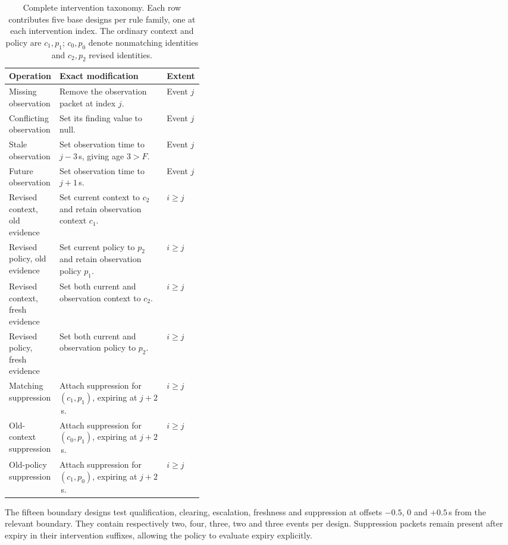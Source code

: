\documentclass[preprint,11pt]{elsarticle}
\begin{document}
\begin{table}[H]
\centering\small
\caption{Complete intervention taxonomy. Each row contributes five base designs per rule family, one at each intervention index. The ordinary context and policy are $c_1,p_1$; $c_0,p_0$ denote nonmatching identities and $c_2,p_2$ revised identities.}
\label{tab:intervention-taxonomy}
\begin{tabularx}{\linewidth}{@{}>{\raggedright\arraybackslash}p{0.26\linewidth}>{\raggedright\arraybackslash}X>{\raggedright\arraybackslash}p{0.12\linewidth}@{}}
\toprule
Operation & Exact modification & Extent \\
\midrule
Missing observation & Remove the observation packet at index $j$. & Event $j$ \\
Conflicting observation & Set its finding value to null. & Event $j$ \\
Stale observation & Set observation time to $j-3$\,s, giving age $3>F$. & Event $j$ \\
Future observation & Set observation time to $j+1$\,s. & Event $j$ \\
Revised context, old evidence & Set current context to $c_2$ and retain observation context $c_1$. & $i\ge j$ \\
Revised policy, old evidence & Set current policy to $p_2$ and retain observation policy $p_1$. & $i\ge j$ \\
Revised context, fresh evidence & Set both current and observation context to $c_2$. & $i\ge j$ \\
Revised policy, fresh evidence & Set both current and observation policy to $p_2$. & $i\ge j$ \\
Matching suppression & Attach suppression for $(c_1,p_1)$, expiring at $j+2$\,s. & $i\ge j$ \\
Old-context suppression & Attach suppression for $(c_0,p_1)$, expiring at $j+2$\,s. & $i\ge j$ \\
Old-policy suppression & Attach suppression for $(c_1,p_0)$, expiring at $j+2$\,s. & $i\ge j$ \\
\bottomrule
\end{tabularx}
\end{table}

The fifteen boundary designs test qualification, clearing, escalation, freshness and suppression at offsets $-0.5$, $0$ and $+0.5$\,s from the relevant boundary. They contain respectively two, four, three, two and three events per design. Suppression packets remain present after expiry in their intervention suffixes, allowing the policy to evaluate expiry explicitly.
\end{document}
